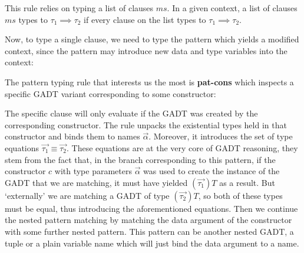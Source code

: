 This rule relies on typing a list of clauses $ms$. In a given context, a list of clauses $ms$ types to $\tau_1 \implies \tau_2$ if every clause on the list types to $\tau_1 \implies \tau_2$.

Now, to type a single clause, we need to type the pattern which yields a modified context, since the pattern may introduce new data and type variables into the context:

\begin{prooftree}
\end{prooftree}

The pattern typing rule that interests us the most is \textbf{pat-cons} which inspects a specific GADT variant corresponding to some constructor:

\begin{prooftree}
\end{prooftree}

The specific clause will only evaluate if the GADT was created by the corresponding constructor. The rule unpacks the existential types held in that constructor and binds them to names $\overrightarrow{\alpha}$. Moreover, it introduces the set of type equations $\overrightarrow{\tau_1} \equiv \overrightarrow{\tau_2}$. These equations are at the very core of GADT reasoning, they stem from the fact that, in the branch corresponding to this pattern, if the constructor $c$ with type parameters $\overrightarrow{\alpha}$ was used to create the instance of the GADT that we are matching, it must have yielded $(\overrightarrow{\tau_1}) T$ as a result. But `externally' we are matching a GADT of type $(\overrightarrow{\tau_2}) T$, so both of these types must be equal, thus introducing the aforementioned equations. Then we continue the nested pattern matching by matching the data argument of the constructor with some further nested pattern. This pattern can be another nested GADT, a tuple or a plain variable name which will just bind the data argument to a name.


